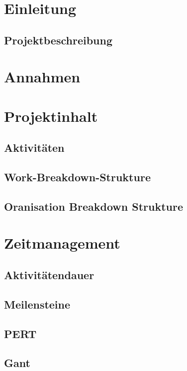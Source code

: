 %
%
%
%
%
%
%
%
%


\section{Einleitung}
\lipsum[2]
\subsection{Projektbeschreibung}
\lipsum[2]
\section{Annahmen}
\lipsum[2]
\section{Projektinhalt}
\lipsum[2]
\subsection{Aktivitäten}
\lipsum[2]
\subsection{Work-Breakdown-Strukture}
\lipsum[2]
\subsection{Oranisation Breakdown Strukture}
\lipsum[2]
\section{Zeitmanagement}
\lipsum[2]
\subsection{Aktivitätendauer}
\lipsum[2]
\subsection{Meilensteine}
\lipsum[2]
\subsection{PERT} %
\lipsum[2]
\subsection{Gant} %
\lipsum[2]


